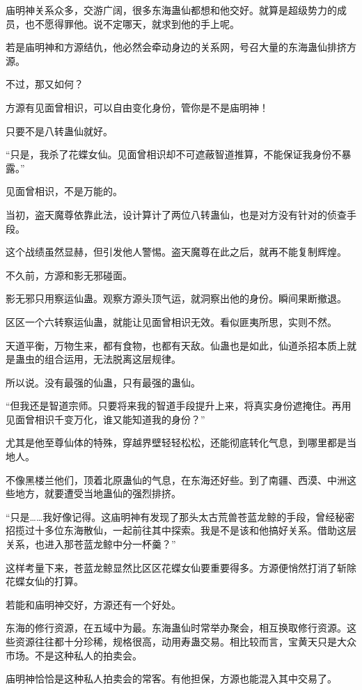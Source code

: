 \begin{this_body}
庙明神关系众多，交游广阔，很多东海蛊仙都想和他交好。就算是超级势力的成员，也不愿得罪他。说不定哪天，就求到他的手上呢。

若是庙明神和方源结仇，他必然会牵动身边的关系网，号召大量的东海蛊仙排挤方源。

不过，那又如何？

方源有见面曾相识，可以自由变化身份，管你是不是庙明神！

只要不是八转蛊仙就好。

“只是，我杀了花蝶女仙。见面曾相识却不可遮蔽智道推算，不能保证我身份不暴露。”

见面曾相识，不是万能的。

当初，盗天魔尊依靠此法，设计算计了两位八转蛊仙，也是对方没有针对的侦查手段。

这个战绩虽然显赫，但引发他人警惕。盗天魔尊在此之后，就再不能复制辉煌。

不久前，方源和影无邪碰面。

影无邪只用察运仙蛊。观察方源头顶气运，就洞察出他的身份。瞬间果断撤退。

区区一个六转察运仙蛊，就能让见面曾相识无效。看似匪夷所思，实则不然。

天道平衡，万物生来，都有食物，也都有天敌。仙蛊也是如此，仙道杀招本质上就是蛊虫的组合运用，无法脱离这层规律。

所以说。没有最强的仙蛊，只有最强的蛊仙。

“但我还是智道宗师。只要将来我的智道手段提升上来，将真实身份遮掩住。再用见面曾相识千变万化，谁又能知道我的身份？”

尤其是他至尊仙体的特殊，穿越界壁轻轻松松，还能彻底转化气息，到哪里都是当地人。

不像黑楼兰他们，顶着北原蛊仙的气息，在东海还好些。到了南疆、西漠、中洲这些地方，就要遭受当地蛊仙的强烈排挤。

“只是……我好像记得。这庙明神有发现了那头太古荒兽苍蓝龙鲸的手段，曾经秘密招揽过十多位东海散仙，一起前往其中探索。我是不是该和他搞好关系。借助这层关系，也进入那苍蓝龙鲸中分一杯羹？”

这样考量下来，苍蓝龙鲸显然比区区花蝶女仙要重要得多。方源便悄然打消了斩除花蝶女仙的打算。

若能和庙明神交好，方源还有一个好处。

东海的修行资源，在五域中为最。东海蛊仙时常举办聚会，相互换取修行资源。这些资源往往都十分珍稀，规格很高，动用寿蛊交易。相比较而言，宝黄天只是大众市场。不是这种私人的拍卖会。

庙明神恰恰是这种私人拍卖会的常客。有他担保，方源也能混入其中交易了。


\end{this_body}
